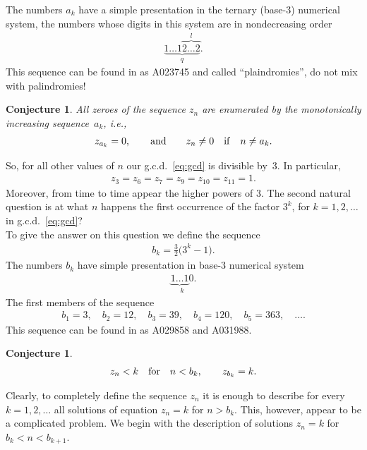 \documentclass[pdftex]{sigma}
\numberwithin{equation}{section}
\newtheorem{Conjecture}[Theorem]{Conjecture}
\begin{document}
The numbers $a_k$ have a simple presentation in the ternary (base-3) numerical system, the numbers whose digits in this system
are in nondecreasing order
\begin{gather*}
\underset{q}{\underbrace{1\ldots1\overset{l}{\overbrace{2\ldots2}}}}.
\end{gather*}
This sequence can be found in \cite{OEIS} as A023745 and called ``plaindromies'', do not mix with palindromies!
\begin{Conjecture}\label{con:zeroes}
All zeroes of the sequence $z_n$ are enumerated by the monotonically increasing sequence~$a_k$, i.e.,
\begin{gather*}
z_{a_k}=0,\qquad{\rm and} \qquad z_n\neq0 \quad {\rm if} \quad n\neq a_k.
\end{gather*}
\end{Conjecture}
So, for all other values of $n$ our g.c.d.~\eqref{eq:gcd} is divisible by~3. In particular,
\begin{gather*}
z_3=z_6=z_7=z_9=z_{10}=z_{11}=1.
\end{gather*}
Moreover, from time to time appear the higher powers of $3$. The second natural question is at what $n$ happens
the first occurrence of the factor $3^k$, for $k=1,2,\ldots$ in g.c.d.~\eqref{eq:gcd}? \\
To give the answer on this question we define the sequence
\begin{gather}\label{eq:b-k}
b_k=\frac32\big(3^k-1\big).
\end{gather}
The numbers $b_k$ have simple presentation in base-3 numerical system
\begin{gather*}
\underset{k}{\underbrace{1\ldots1}0}.
\end{gather*}
The first members of the sequence
\begin{gather*}
b_1=3,\quad
b_2=12,\quad
b_3=39,\quad
b_4=120,\quad
b_5=363,\quad\ldots.
\end{gather*}
This sequence can be found in \cite{OEIS} as A029858 and A031988.
\begin{Conjecture}\label{con:b-k}
\begin{gather*}
z_n<k\quad{\rm for}\quad n<b_k,\qquad z_{b_k}=k.
\end{gather*}
\end{Conjecture}
Clearly, to completely define the sequence $z_n$ it is enough to describe for every $k=1,2,\ldots$ all solutions of equation
$z_n=k$ for $n>b_k$. This, however, appear to be a complicated problem. We begin with the description of solutions
$z_n=k$ for $b_k<n<b_{k+1}$.
\end{document}
